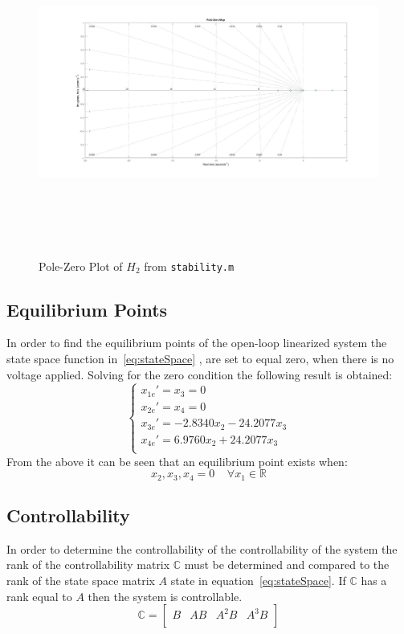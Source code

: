 \documentclass[12pt]{article} %
\begin{document}
\begin{figure}[h] 
\caption{Pole-Zero Plot of $H_2$ from \texttt{stability.m}}
\includegraphics[height=10cm, width = 17cm]{h2fig.jpg}
\label{fig:pz2}
\centering
\end{figure}
\subsection{Equilibrium Points}
In order to find the equilibrium points of the open-loop linearized system the state space function in~\ref{eq:stateSpace} , are set to equal zero, when there is no voltage applied. Solving for the zero condition the following result is obtained: 
\begin{equation}
\begin{cases}
x_{1e}' = x_3 = 0 \\
x_{2e}' = x_4 = 0 \\
x_{3e}' = -2.8340x_2 - 24.2077x_3\\
x_{4e}' = 6.9760x_2 +24.2077x_3\\
\end{cases}
\end{equation}
From the above it can be seen that an equilibrium point exists when:
\begin{equation}
x_2,x_3,x_4 = 0 \; \; \; \; \forall x_1 \in \mathbb{R}
\end{equation}
\subsection{Controllability}
In order to determine the controllability of the controllability of the system the rank of the controllability matrix $\mathbb{C}$ must be determined and compared to the rank of the state space matrix $A$ state in equation~\ref{eq:stateSpace}. If $\mathbb{C}$ has a rank equal to $A$ then the system is controllable. 
\begin{equation}
\mathbb{C} = 
\begin{bmatrix}
B & AB & A^2B & A^3B \\
\end{bmatrix}
\end{equation}
\end{document}
